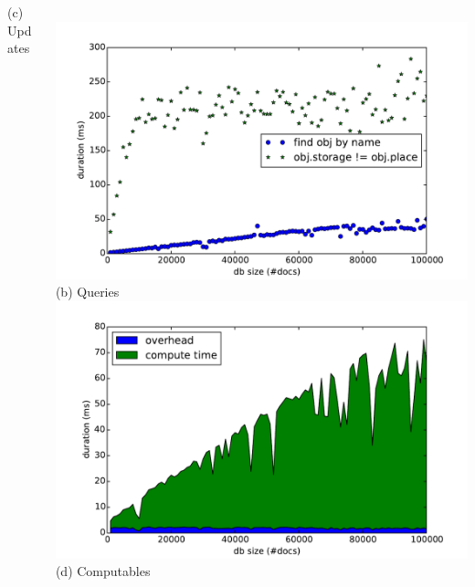 \begin{frame}
\begin{columns}
\begin{column}{0.55\textwidth}
    (c) Updates
    \end{column}
    \begin{column}{0.55\textwidth}
  \centering
    \\\vspace{-0.08cm}
    \includegraphics[width=\textwidth]{../thesis/plots/query-durations}\\
    (b) Queries
    \\\vspace{-0.08cm}
    \includegraphics[width=\textwidth]{../thesis/plots/computable-durations}\\
    (d) Computables
    \end{column}
  \end{columns}
\end{frame}


